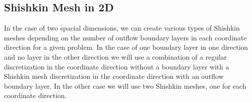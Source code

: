 \subsection{Shishkin Mesh in 2D}
\label{back:convdiff:shihs2D}

In the case of two spacial dimensions, we can create various types of Shishkin
meshes depending on the number of outflow boundary layers in each coordinate
direction for a given problem. In the case of one boundary layer in one
direction and no layer in the other direction we will use a combination of a
regular discretization in the coordinate direction without a boundary layer
with a Shishkin mesh discretization in the coordinate direction with an
outflow boundary layer. In the other case we will use two Shishkin meshes, one
for each coordinate direction.

